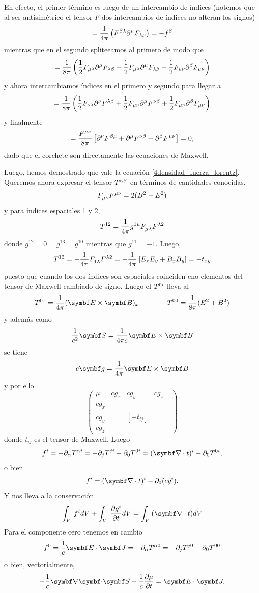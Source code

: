 \documentclass[10pt,oneside]{CBFT_book}
\begin{document}
En efecto, el primer término es luego de un intercambio de índices (notemos que al ser
antisimétrico el tensor $F$ dos intercambios de índices no alteran los signos)
\[
	= \frac{1}{4\pi} \left( F^{\beta\lambda} \partial^\mu F_{\lambda\mu} \right) = - f^\beta
\]
mientras que en el segundo spliteeamos al primero de modo que
\[
	= \frac{1}{8\pi} \left( \frac{1}{2} F_{\mu\lambda}\partial^\mu F_{\lambda\beta} 
	+ \frac{1}{2} F_{\mu\lambda}\partial^\mu F_{\lambda\beta} 
	+ \frac{1}{2} F_{\mu\nu}\partial^\beta F_{\mu\nu} 
	\right)
\]
y ahora intercambiamos índices en el primero y segundo para llegar a
\[
	= \frac{1}{8\pi} \left( 
	 \frac{1}{2} F_{\nu\lambda}\partial^\nu F^{\lambda\beta} 
	+ \frac{1}{2} F_{\mu\nu}\partial^\mu F^{\nu\beta} 
	+ \frac{1}{2} F_{\mu\nu}\partial^\beta F_{\mu\nu} 
	\right)
\]
y finalmente
\[
	= \frac{F^{\mu\nu}}{8\pi} \left[ \partial^\nu F^{\beta\mu} + 
	\partial^\mu F^{\nu\beta} + \partial^\beta F^{\mu\nu} \right] = 0,
\]
dado que el corchete son directamente las ecuaciones de Maxwell.

Luego, hemos demostrado que vale la ecuación \eqref{4densidad_fuerza_lorentz}.
Queremos ahora expresar el tensor $T_{}^{\alpha\beta}$ en términos de cantidades conocidas.
\[
	F_{\mu\nu}^{}F_{}^{\mu\nu} = 2 ( B^2 - E^2 )
\]
y para índices espaciales 1 y 2,
\[
	T_{}^{12} = \frac{1}{4\pi} g_{}^{1\mu} F_{\mu\lambda}^{} F_{}^{\lambda 2}
\]
donde $g^{12}=0=g^{13}=g^{10}$ mientras que $g^{11}=-1$. Luego,
\[
	T_{}^{12} = - \frac{1}{4\pi} F_{1\lambda}^{} F_{}^{\lambda 2} =
	- \frac{1}{4\pi} \: [ E_x E_y + B_x B_y ] = - t_{xy}
\]
puesto que cuando los dos índices son espaciales coinciden cno elementos del tensor
de Maxwell cambiado de signo.
Luego el $T_{}^{0i}$ lleva al
\[
	T^{01} = \frac{1}{4\pi}(\pv{E}{B})_x \qquad \qquad 
	T^{00} = \frac{1}{8\pi}( E^2 + B^2 )
\]
y además como
\[
	\frac{1}{c^2} \vb{S} = \frac{1}{4\pi c} \pv{E}{B}
\]
se tiene
\[
	c \vb{g} = \frac{1}{4\pi} \pv{E}{B}
\]
y por ello
\[
	\begin{pmatrix}
	\mu & c g_x & c g_y & c g_z \\
	c g_x &   & & & \\
	c g_y &  & [ - t_{ij} ] & &\\
	c g_z & & & &
	\end{pmatrix}
\]
donde $t_{ij}$ es el tensor de Maxwell. Luego
\[
	f^i = - \partial_\a T^{\a i} = - \partial_j T^{j i} - \partial_0 T^{0 i} = 
	(\Nabla \cdot t )^i - \partial_0 T^{0 i},
\]
o bien
\[
	f^i = (\Nabla \cdot t )^i - \partial_0 ( c g^i ).
\]
Y nos lleva a la conservación
\[
	\int_V \: f^i dV + \int_V \: \dpar{g^i}{t} dV = \int_V \: (\Nabla \cdot t ) dV
\]
Para el componente cero tenemos en cambio
\[
	f^0 = \frac{1}{c} \pe{E}{J} = -\partial_\a T^{\a 0} = 
	- \partial_j T^{j 0} - \partial_0 T^{0 0}
\]
o bien, vectorialmente,
\[
	- \frac{1}{c} \divem{S} - \frac{1}{c} \dpar{\mu}{t} = \pe{E}{J}.
\]
\end{document}
